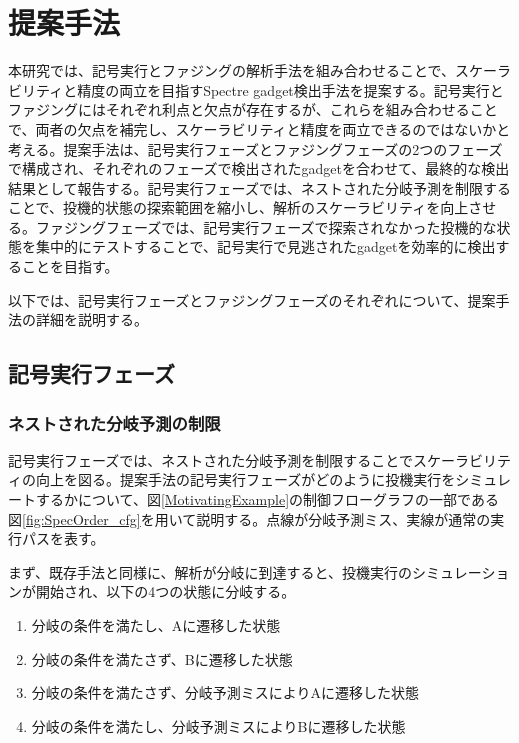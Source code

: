 \section{提案手法}
本研究では、記号実行とファジングの解析手法を組み合わせることで、スケーラビリティと精度の両立を目指すSpectre gadget検出手法を提案する。記号実行とファジングにはそれぞれ利点と欠点が存在するが、これらを組み合わせることで、両者の欠点を補完し、スケーラビリティと精度を両立できるのではないかと考える。提案手法は、記号実行フェーズとファジングフェーズの2つのフェーズで構成され、それぞれのフェーズで検出されたgadgetを合わせて、最終的な検出結果として報告する。記号実行フェーズでは、ネストされた分岐予測を制限することで、投機的状態の探索範囲を縮小し、解析のスケーラビリティを向上させる。ファジングフェーズでは、記号実行フェーズで探索されなかった投機的な状態を集中的にテストすることで、記号実行で見逃されたgadgetを効率的に検出することを目指す。\par
以下では、記号実行フェーズとファジングフェーズのそれぞれについて、提案手法の詳細を説明する。

\subsection{記号実行フェーズ}
\subsubsection{ネストされた分岐予測の制限}
記号実行フェーズでは、ネストされた分岐予測を制限することでスケーラビリティの向上を図る。提案手法の記号実行フェーズがどのように投機実行をシミュレートするかについて、図\ref{MotivatingExample}の制御フローグラフの一部である図\ref{fig:SpecOrder_cfg}を用いて説明する。点線が分岐予測ミス、実線が通常の実行パスを表す。\par
まず、既存手法と同様に、解析が分岐に到達すると、投機実行のシミュレーションが開始され、以下の4つの状態に分岐する。\par

\begin{enumerate}
  \item 分岐の条件を満たし、Aに遷移した状態
  \item 分岐の条件を満たさず、Bに遷移した状態
  \item 分岐の条件を満たさず、分岐予測ミスによりAに遷移した状態
  \item 分岐の条件を満たし、分岐予測ミスによりBに遷移した状態
\end{enumerate}

